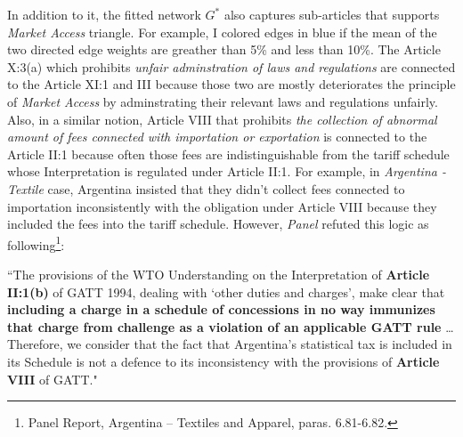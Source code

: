 In addition to it, 
the fitted network $G^*$ also captures sub-articles that supports \textit{Market Access} triangle. For example, I colored edges in blue if the mean of the two directed edge weights are greather than 5\% and less than 10\%.
The Article X:3(a) which prohibits \textit{unfair adminstration of laws and regulations} are connected to the Article XI:1 and III because those two are mostly 
deteriorates the principle of \textit{Market Access} by adminstrating their relevant laws and regulations unfairly. Also, in a similar notion, Article VIII that prohibits \textit{the collection of abnormal amount of fees connected with importation or exportation} is connected to the Article II:1 because 
often those fees are indistinguishable from the tariff schedule whose Interpretation is regulated under Article II:1. For example, in \textit{Argentina - Textile} case, Argentina insisted that they didn't collect fees connected to importation inconsistently with the obligation under Article VIII because they included the fees into the tariff schedule. %
However, \textit{Panel} refuted this logic as following\footnote{Panel Report, Argentina – Textiles and Apparel, paras. 6.81-6.82.}:

\begin{displayquote}[][]
``The provisions of the WTO Understanding on the Interpretation of \textbf{Article II:1(b)} of
GATT 1994, dealing with `other duties and charges’, make clear that \textbf{including a
charge in a schedule of concessions in no way immunizes that charge from challenge
as a violation of an applicable GATT rule} \ldots Therefore, we consider that the fact that Argentina's statistical tax is included in its
Schedule is not a defence to its inconsistency with the provisions of \textbf{Article VIII} of
GATT."
\end{displayquote}








